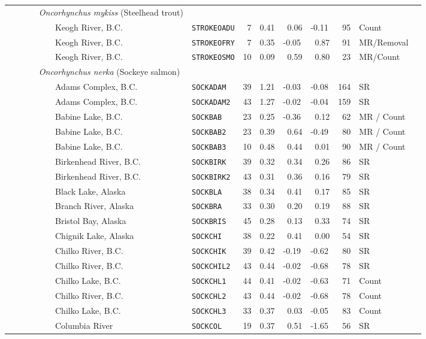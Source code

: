 \begin{flushleft}
\begin{tabular*}{7.1in}{llllllllll}
&{\it~~~~~Oncorhynchus mykiss} (Steelhead trout)&~&~&~&~&~&~&~  & \\ 
&~~~~~~~~~Keogh River, B.C.&{\tt STROKEOADU}&~7&0.41&~0.06&-0.11&~95&Count  & \\ 
&~~~~~~~~~Keogh River, B.C.&{\tt STROKEOFRY}&~7&0.35&-0.05&~0.87&~91&MR/Removal  & \\ 
&~~~~~~~~~Keogh River, B.C.&{\tt STROKEOSMO}&10&0.09&~0.59&~0.80&~23&MR/Count  & \\ 
&{\it~~~~~Oncorhynchus nerka} (Sockeye salmon)&~&~&~&~&~&~&~  & \\ 
&~~~~~~~~~Adams Complex, B.C.&{\tt SOCKADAM}&39&1.21&-0.03&-0.08&164&SR  & \\ 
&~~~~~~~~~Adams Complex, B.C.&{\tt SOCKADAM2}&43&1.27&-0.02&-0.04&159&SR  & \\ 
&~~~~~~~~~Babine Lake, B.C.&{\tt SOCKBAB}&23&0.25&-0.36&~0.12&~62&MR / Count  & \\ 
&~~~~~~~~~Babine Lake, B.C.&{\tt SOCKBAB2}&23&0.39&~0.64&-0.49&~80&MR / Count  & \\ 
&~~~~~~~~~Babine Lake, B.C.&{\tt SOCKBAB3}&10&0.48&~0.44&~0.01&~90&MR / Count  & \\ 
&~~~~~~~~~Birkenhead River, B.C.&{\tt SOCKBIRK}&39&0.32&~0.34&~0.26&~86&SR  & \\ 
&~~~~~~~~~Birkenhead River, B.C.&{\tt SOCKBIRK2}&43&0.31&~0.36&~0.16&~79&SR  & \\ 
&~~~~~~~~~Black Lake, Alaska&{\tt SOCKBLA}&38&0.34&~0.41&~0.17&~85&SR  & \\ 
&~~~~~~~~~Branch River, Alaska&{\tt SOCKBRA}&33&0.30&~0.20&~0.19&~88&SR  & \\ 
&~~~~~~~~~Bristol Bay, Alaska&{\tt SOCKBRIS}&45&0.28&~0.13&~0.33&~74&SR  & \\ 
&~~~~~~~~~Chignik Lake, Alaska&{\tt SOCKCHI}&38&0.22&~0.41&~0.00&~54&SR  & \\ 
&~~~~~~~~~Chilko River, B.C.&{\tt SOCKCHIK}&39&0.42&-0.19&-0.62&~80&SR  & \\ 
&~~~~~~~~~Chilko River, B.C.&{\tt SOCKCHIL2}&43&0.44&-0.02&-0.68&~78&SR  & \\ 
&~~~~~~~~~Chilko Lake, B.C.&{\tt SOCKCHL1}&44&0.41&-0.02&-0.63&~71&Count  & \\ 
&~~~~~~~~~Chilko River, B.C.&{\tt SOCKCHL2}&43&0.44&-0.02&-0.68&~78&Count  & \\ 
&~~~~~~~~~Chilko Lake, B.C.&{\tt SOCKCHL3}&33&0.37&~0.03&-0.05&~83&Count  & \\ 
&~~~~~~~~~Columbia River&{\tt SOCKCOL}&19&0.37&~0.51&-1.65&~56&SR  & \\ 

\end{tabular*}
\end{flushleft}
